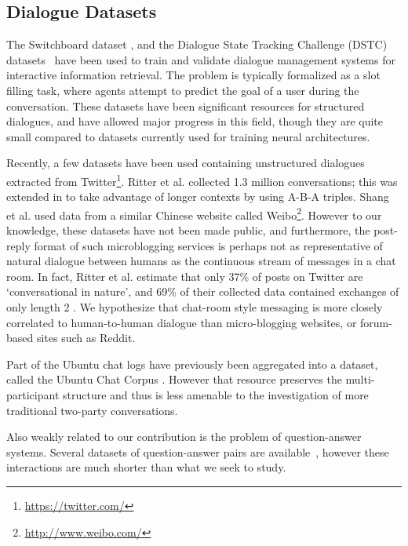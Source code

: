 \documentclass[11pt,a4paper]{article}
\begin{document}
\subsection{Dialogue Datasets}

The Switchboard dataset \cite{godfrey1992switchboard}, and the Dialogue State Tracking Challenge (DSTC) datasets~\cite{williams2013dialog} have been used to train and validate dialogue management systems for interactive information retrieval. The problem is typically formalized as a slot filling task, where agents attempt to predict the goal of a user during the conversation.   These datasets have been significant resources for structured dialogues, and have allowed major progress in this field, though they are quite small compared to datasets currently used for training neural architectures.

Recently, a few datasets have been used containing unstructured dialogues extracted from Twitter\footnote{\url{https://twitter.com/}}.
Ritter et al. \cite{ritter2010unsupervised} collected  1.3 million conversations; this was extended in \cite{sordoni2015} to take advantage of longer contexts by using A-B-A triples. Shang et al. \cite{shang2015neural} used data from a similar Chinese website called Weibo\footnote{\url{http://www.weibo.com/}}.  However to our knowledge, these datasets have not been made public, and furthermore, the post-reply format of such microblogging services is perhaps not as representative of natural dialogue between humans as the continuous stream of messages in a chat room. In fact, Ritter et al. estimate that only 37\% of posts on Twitter are `conversational in nature', and 69\% of their collected data contained exchanges of only length 2 \cite{ritter2010unsupervised}. We hypothesize that chat-room style messaging is more closely correlated to human-to-human dialogue than micro-blogging websites, or forum-based sites such as Reddit.


Part of the Ubuntu chat logs have previously been aggregated into a dataset, called the Ubuntu Chat Corpus \cite{uthus2013ubuntu}. However that resource preserves the multi-participant structure and thus is less amenable to the investigation of more traditional two-party conversations.

Also weakly related to our contribution is the problem of question-answer systems. Several datasets of question-answer pairs are available~\cite{boyd-graber12}, however these interactions are much shorter than what we seek to study.
\end{document}

